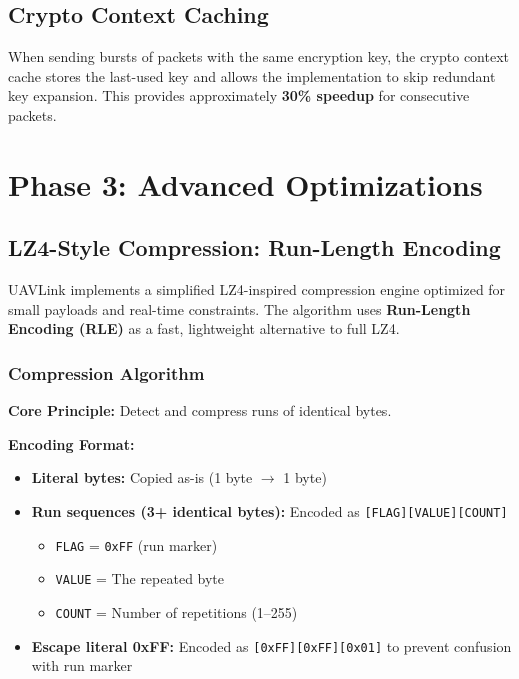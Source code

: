 \documentclass[11pt,a4paper]{article}
\begin{document}
\subsection{Crypto Context Caching}

When sending bursts of packets with the same encryption key, the crypto context cache stores the last-used key and allows the implementation to skip redundant key expansion. This provides approximately \textbf{30\% speedup} for consecutive packets.

\newpage
\section{Phase 3: Advanced Optimizations}

\subsection{LZ4-Style Compression: Run-Length Encoding}

UAVLink implements a simplified LZ4-inspired compression engine optimized for small payloads and real-time constraints. The algorithm uses \textbf{Run-Length Encoding (RLE)} as a fast, lightweight alternative to full LZ4.

\subsubsection{Compression Algorithm}

\textbf{Core Principle:} Detect and compress runs of identical bytes.

\textbf{Encoding Format:}
\begin{itemize}[noitemsep]
    \item \textbf{Literal bytes:} Copied as-is (1 byte $\to$ 1 byte)
    \item \textbf{Run sequences (3+ identical bytes):} Encoded as \texttt{[FLAG][VALUE][COUNT]}
    \begin{itemize}
        \item \texttt{FLAG} = \texttt{0xFF} (run marker)
        \item \texttt{VALUE} = The repeated byte
        \item \texttt{COUNT} = Number of repetitions (1--255)
    \end{itemize}
    \item \textbf{Escape literal 0xFF:} Encoded as \texttt{[0xFF][0xFF][0x01]} to prevent confusion with run marker
\end{itemize}
\end{document}
